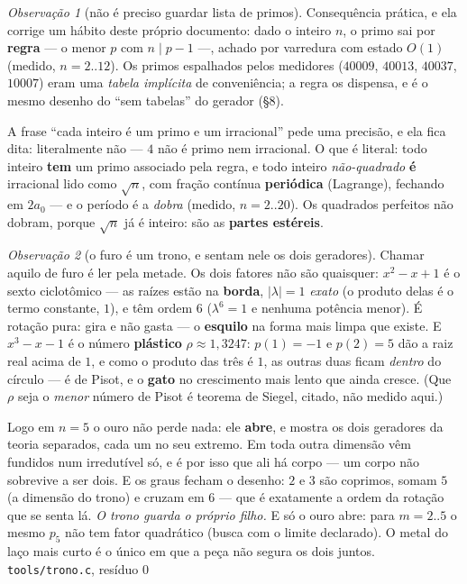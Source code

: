 \documentclass[11pt]{article}
\newcommand{\code}[1]{\texttt{\small #1}}
\theoremstyle{plain}
\theoremstyle{remark}
\newtheorem{obs}{Observação}
\begin{document}
\begin{obs}[não é preciso guardar lista de primos]
Consequência prática, e ela corrige um hábito deste próprio documento: dado o inteiro $n$, o primo sai
por \textbf{regra} --- o menor $p$ com $n\mid p-1$ ---, achado por varredura com estado $O(1)$ (medido,
$n=2..12$). Os primos espalhados pelos medidores ($40009$, $40013$, $40037$, $10007$) eram uma
\emph{tabela implícita} de conveniência; a regra os dispensa, e é o mesmo desenho do ``sem tabelas'' do
gerador (§8).

A frase ``cada inteiro é um primo e um irracional'' pede uma precisão, e ela fica dita: literalmente
não --- $4$ não é primo nem irracional. O que é literal: todo inteiro \textbf{tem} um primo associado
pela regra, e todo inteiro \emph{não-quadrado} \textbf{é} irracional lido como $\sqrt n$, com fração
contínua \textbf{periódica} (Lagrange), fechando em $2a_0$ --- e o período é a \emph{dobra} (medido,
$n=2..20$). Os quadrados perfeitos não dobram, porque $\sqrt n$ já é inteiro: são as \textbf{partes
estéreis}.
\end{obs}

\begin{obs}[o furo é um trono, e sentam nele os dois geradores]\label{obs:trono}
Chamar aquilo de furo é ler pela metade. Os dois fatores não são quaisquer:
$x^2-x+1$ é o sexto ciclotômico --- as raízes estão na \textbf{borda}, $|\lambda|=1$
\emph{exato} (o produto delas é o termo constante, $1$), e têm ordem $6$ ($\lambda^6=1$ e nenhuma
potência menor). É rotação pura: gira e não gasta --- o \textbf{esquilo} na forma mais limpa que
existe. E $x^3-x-1$ é o número \textbf{plástico} $\rho\approx1{,}3247$: $p(1)=-1$ e $p(2)=5$ dão a
raiz real acima de $1$, e como o produto das três é $1$, as outras duas ficam \emph{dentro} do
círculo --- é de Pisot, e o \textbf{gato} no crescimento mais lento que ainda cresce. (Que $\rho$
seja o \emph{menor} número de Pisot é teorema de Siegel, citado, não medido aqui.)

Logo em $n=5$ o ouro não perde nada: ele \textbf{abre}, e mostra os dois geradores da teoria
separados, cada um no seu extremo. Em toda outra dimensão vêm fundidos num irredutível só, e é por
isso que ali há corpo --- um corpo não sobrevive a ser dois. E os graus fecham o desenho: $2$ e $3$
são coprimos, somam $5$ (a dimensão do trono) e cruzam em $6$ --- que é exatamente a ordem da rotação
que se senta lá. \emph{O trono guarda o próprio filho.} E só o ouro abre: para $m=2..5$ o mesmo
$p_5$ não tem fator quadrático (busca com o limite declarado). O metal do laço mais curto é o único
em que a peça não segura os dois juntos. \hfill{\small\code{tools/trono.c}, resíduo $0$}
\end{obs}
\end{document}

